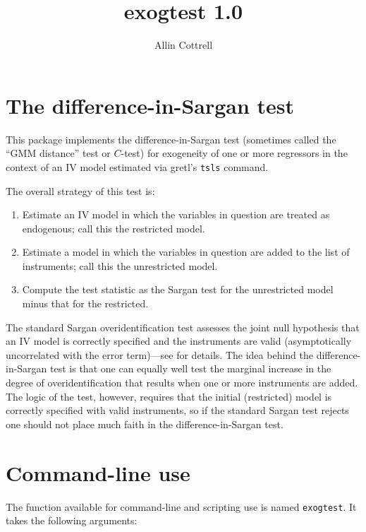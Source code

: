 \documentclass{article}
\begin{document}
\setlength{\parindent}{0pt}
\setlength{\parskip}{1ex}

\title{exogtest 1.0}
\author{Allin Cottrell}
\maketitle

\section{The difference-in-Sargan test}

This package implements the difference-in-Sargan test (sometimes
called the ``GMM distance'' test or $C$-test) for exogeneity of one or
more regressors in the context of an IV model estimated via gretl's
\texttt{tsls} command.

The overall strategy of this test is:
\begin{enumerate}
\item Estimate an IV model in which the variables in question are
  treated as endogenous; call this the restricted model.
\item Estimate a model in which the variables in question are added to
  the list of instruments; call this the unrestricted model.
\item Compute the test statistic as the Sargan test for the
  unrestricted model minus that for the restricted.
\end{enumerate}

The standard Sargan overidentification test assesses the joint null
hypothesis that an IV model is correctly specified and the instruments
are valid (asymptotically uncorrelated with the error term)---see
\citet[][section 7.8]{davidson-mackinnon93} for details. The idea
behind the difference-in-Sargan test is that one can equally well test
the marginal increase in the degree of overidentification that results
when one or more instruments are added. The logic of the test,
however, requires that the initial (restricted) model is correctly
specified with valid instruments, so if the standard Sargan test
rejects one should not place much faith in the difference-in-Sargan
test.

\section{Command-line use}

The function available for command-line and scripting use is named
\texttt{exogtest}. It takes the following arguments:
\end{document}
